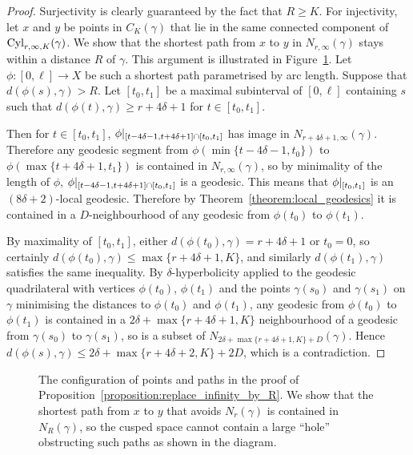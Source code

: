 \begin{proof} 
  Surjectivity is clearly guaranteed by the fact that $R \geq K$. 
  For injectivity, let $x$ and $y$ be points in $C_K(\gamma)$ that lie in the same connected component of $\operatorname{Cyl}_{r, \infty, K}(\gamma)$. 
  We show that the shortest path from $x$ to $y$ in $N_{r, \infty}(\gamma)$ stays within a distance $R$ of $\gamma$. 
  This argument is illustrated in Figure~\ref{figure:replace_infinity_by_R}.
  Let $\phi\colon [0,\ell] \to X$ be such a shortest path parametrised by arc length. 
  Suppose that $d(\phi(s),\gamma) > R$. 
  Let $[t_0,t_1]$ be a maximal subinterval of $[0, \ell]$ containing $s$ such that $d(\phi(t),\gamma) \geq r + 4\delta + 1$ for $t \in [t_0,t_1]$. 

  Then for $t \in [t_0,t_1]$, $\phi\vert_{[t-4\delta-1,t+4\delta+1] \cap[t_0, t_1]}$ has image in $N_{r+4\delta+1, \infty}(\gamma)$.  
  Therefore any geodesic segment from $\phi(\min\{t-4\delta-1, t_0\})$ to $\phi(\max\{t+4\delta+1, t_1\})$ is contained in $N_{r, \infty}(\gamma)$, so by minimality of the length of $\phi$, $\phi\vert_{[t-4\delta-1,t+4\delta+1] \cap [t_0, t_1]}$ is a geodesic. 
  This means that $\phi\vert_{[t_0,t_1]}$ is an $(8\delta+2)$-local geodesic. 
  Therefore by Theorem~\ref{theorem:local_geodesics} it is contained in a $D$-neighbourhood of any geodesic from $\phi(t_0)$ to $\phi(t_1)$.

  By maximality of $[t_0,t_1]$, either $d(\phi(t_0),\gamma) = r + 4\delta+1$ or $t_0=0$, so certainly $d(\phi(t_0),\gamma) \leq \max\{r+4\delta+1,K\}$, and similarly $d(\phi(t_1),\gamma)$ satisfies the same inequality. 
  By $\delta$-hyperbolicity applied to the geodesic quadrilateral with vertices $\phi(t_0)$, $\phi(t_1)$ and the points $\gamma(s_0)$ and $\gamma(s_1)$ on $\gamma$ minimising the distances to $\phi(t_0)$ and $\phi(t_1)$, any geodesic from $\phi(t_0)$ to $\phi(t_1)$ is contained in a $2\delta + \max\{r + 4\delta + 1, K\}$ neighbourhood of a geodesic from $\gamma(s_0)$ to $\gamma(s_1)$, so is a subset of $N_{2\delta+\max\{r+4\delta+1, K\} + D}(\gamma)$. 
  Hence $d(\phi(s),\gamma) \leq 2\delta + \max\{r+4\delta+2,K\} + 2D$, which is a contradiction. 
\end{proof}

\begin{figure}
  \begin{center}
    
  \end{center}
  \caption{
    \label{figure:replace_infinity_by_R}
    The configuration of points and paths in the proof of Proposition~\ref{proposition:replace_infinity_by_R}.
    We show that the shortest path from $x$ to $y$ that avoids $N_r(\gamma)$ is contained in $N_R(\gamma)$, so the cusped space cannot contain a large ``hole'' obstructing such paths as shown in the diagram.
  }
\end{figure}

